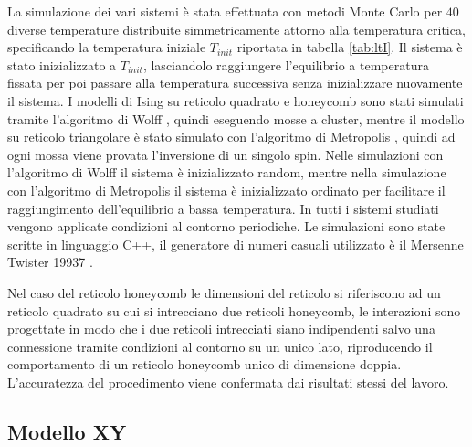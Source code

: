 \documentclass{article}
\begin{document}
La simulazione dei vari sistemi è stata effettuata con metodi Monte Carlo per $40$ diverse temperature distribuite simmetricamente attorno alla temperatura critica, specificando la temperatura iniziale $T_{init}$ riportata in tabella \ref{tab:ltI}.
Il sistema è stato inizializzato a $T_{init}$, lasciandolo raggiungere l'equilibrio a temperatura fissata per poi passare alla temperatura successiva senza inizializzare nuovamente il sistema.
I modelli di Ising su reticolo quadrato e honeycomb sono stati simulati tramite l'algoritmo di Wolff \cite{wolff}, quindi eseguendo mosse a cluster, mentre il modello su reticolo triangolare è stato simulato con l'algoritmo di Metropolis \cite{metropolis}, quindi ad ogni mossa viene provata l'inversione di un singolo spin.
Nelle simulazioni con l'algoritmo di Wolff il sistema è inizializzato random, mentre nella simulazione con l'algoritmo di Metropolis il sistema è inizializzato ordinato per facilitare il raggiungimento dell'equilibrio a bassa temperatura.
In tutti i sistemi studiati vengono applicate condizioni al contorno periodiche.
Le simulazioni sono state scritte in linguaggio C++, il generatore di numeri casuali utilizzato è il Mersenne Twister 19937 \cite{mersenne}.

Nel caso del reticolo honeycomb le dimensioni del reticolo si riferiscono ad un reticolo quadrato su cui si intrecciano due reticoli honeycomb, le interazioni sono progettate in modo che i due reticoli intrecciati siano indipendenti salvo una connessione tramite condizioni al contorno su un unico lato, riproducendo il comportamento di un reticolo honeycomb unico di dimensione doppia.
L'accuratezza del procedimento viene confermata dai risultati stessi del lavoro.

\subsection{Modello XY}
\end{document}
